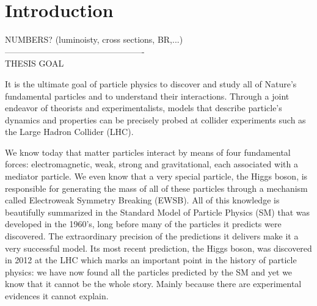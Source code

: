 
\chapter{Introduction}
\label{chapter:introduction}

NUMBERS? (luminoisty, cross sections, BR,...)\\
-------------------------------------------------\\

THESIS GOAL

It is the ultimate goal of particle physics to discover and study all of Nature's fundamental particles and to understand their interactions. Through a joint endeavor of theorists and experimentalists, models that describe particle's dynamics and properties can be precisely probed at collider experiments such as the Large Hadron Collider (LHC). 

We know today that matter particles interact by means of four fundamental forces: electromagnetic, weak, strong and gravitational, each associated with a mediator particle. We even know that a very special particle, the Higgs boson, is responsible for generating the mass of all of these particles through a mechanism called Electroweak Symmetry Breaking (EWSB). All of this knowledge is beautifully summarized in the Standard Model of Particle Physics (SM) that was developed in the 1960's, long before many of the particles it predicts were discovered. The extraordinary precision of the predictions it delivers make it a very successful model. Its most recent prediction, the Higgs boson, was discovered in 2012 at the LHC which marks an important point in the history of particle physics: we have now found all the particles predicted by the SM and yet we know that it cannot be the whole story. Mainly because there are experimental evidences it cannot explain.

